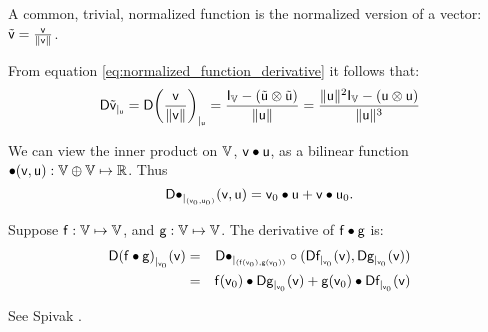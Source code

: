 A common, trivial, normalized function is the normalized version of
a vector: $\tilde{\mathsf{v}} =  \frac{\mathsf{v}}{ \| \mathsf{v} \| }$.

From equation \ref{eq:normalized_function_derivative}
it follows that:
\begin{equation}
\label{eq:normalized_vector_derivative}
{\mathsf{D}{\tilde{\mathsf{v}}}_{\mid_{\mathsf{u}}}}
 =
{\mathsf{D}{ \left( \frac{\mathsf{v}}{ \| \mathsf{v} \| } \right) }_{\mid_{\mathsf{u}}}}
 =
\frac{\mathsf{I}_{\mathbb{V}} - \left( \tilde{\mathsf{u}} \otimes \tilde{\mathsf{u}} \right) }
{ \| \mathsf{u} \| }
 =
\frac{\| \mathsf{u} \|^2 \mathsf{I}_{\mathbb{V}} - \left( \mathsf{u} \otimes \mathsf{u} \right) }
{\| \mathsf{u} \|^3}
\end{equation}

\label{sec:derivatives-of-real-valued-functions}

\label{sec:derivatives-of-inner-products}

We can view the inner product on $\mathbb{V}$, $\mathsf{v} \bullet \mathsf{u}$,
as a bilinear function $\bullet(\mathsf{v},\mathsf{u}) : \mathbb{V} \oplus \mathbb{V} \mapsto \mathbb{R}$.
Thus
\begin{equation}
{\mathsf{D}{\bullet}_{\mid_{(\mathsf{v}_0,\mathsf{u}_0)}}({\mathsf{v},\mathsf{u}})} = \mathsf{v}_0 \bullet \mathsf{u} + \mathsf{v} \bullet \mathsf{u}_0.
\end{equation}

Suppose
$\mathsf{f}:\mathbb{V} \mapsto \mathbb{V}$, and
$\mathsf{g}:\mathbb{V} \mapsto \mathbb{V}$.
The derivative of $\mathsf{f} \bullet \mathsf{g}$ is:
\begin{eqnarray}
\label{eq:dot_derivative}
{\mathsf{D}{(\mathsf{f}\bullet \mathsf{g})}_{\mid_{\mathsf{v}_0}}({\mathsf{v}})}
& =
& {\mathsf{D}{\bullet}_{\mid_{(\mathsf{f}(\mathsf{v}_0),\mathsf{g}(\mathsf{v}_0))}}} \circ ({\mathsf{D}{\mathsf{f}}_{\mid_{\mathsf{v}_0}}({\mathsf{v}})}, {\mathsf{D}{\mathsf{g}}_{\mid_{\mathsf{v}_0}}({\mathsf{v}})})
\\
& =
& \mathsf{f}(\mathsf{v}_0) \bullet {\mathsf{D}{\mathsf{g}}_{\mid_{\mathsf{v}_0}}({\mathsf{v}})}  +  \mathsf{g}(\mathsf{v}_0) \bullet {\mathsf{D}{\mathsf{f}}_{\mid_{\mathsf{v}_0}}({\mathsf{v}})} \nonumber
\end{eqnarray}

See Spivak \cite[ex.~2-13]{spivak-1965}.

\label{sec:derivatives-of-angles}

